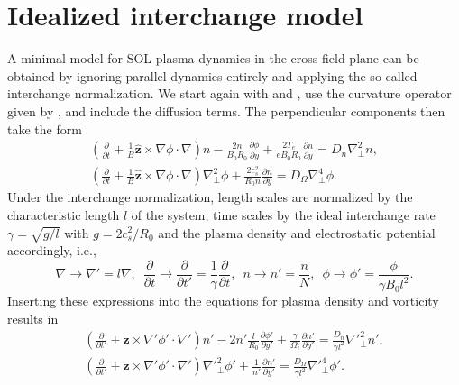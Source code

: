 \section{Idealized interchange model}
A minimal model for SOL plasma dynamics in the cross-field plane can be obtained by ignoring parallel dynamics entirely and applying the so called interchange normalization. We start again with  and , use the curvature operator given by , and include the diffusion terms. The perpendicular components then take the form
\begin{subequations}
	\begin{gather}
		\left(\frac{\partial}{\partial t} + \frac{1}{B}\widehat{\textbf{z}}\times \nabla\phi\cdot\nabla\right) n - \frac{2n}{B_0 R_0}\frac{\partial \phi}{\partial y} + \frac{2T_e}{eB_0R_0}\frac{\partial n}{\partial y} = D_n\nabla_\perp^2 n,
		\\
		 \left(\frac{\partial}{\partial t} + \frac{1}{B}\widehat{\textbf{z}}\times \nabla\phi\cdot\nabla\right)\nabla_\perp^2\phi + \frac{2c_s^2}{R_0n}\frac{\partial n}{\partial y} = D_\Omega\nabla_\perp^4 \phi.
	\end{gather}
\end{subequations}
Under the interchange normalization, length scales are normalized by the characteristic length $l$ of the system, time scales by the ideal interchange rate $\gamma = \sqrt{g/l}$ with $g=2c_s^2/R_0$ and the plasma density and electrostatic potential accordingly, i.e.,
\begin{equation}
	\nabla \rightarrow \nabla' = l\nabla, \,\,\, \frac{\partial}{\partial t} \rightarrow \frac{\partial}{\partial t'} = \frac{1}{\gamma}\frac{\partial}{\partial t}, \,\,\,n \rightarrow n' = \frac{n}{N},\,\,\,\phi \rightarrow \phi' = \frac{\phi}{\gamma B_0l^2}.
\end{equation}
Inserting these expressions into the equations for plasma density and vorticity results in 
\begin{subequations}
	\begin{gather}
		\left(\frac{\partial}{\partial t'} + \widehat{\textbf{z}}\times \nabla'\phi'\cdot\nabla'\right) n' - 2n'\frac{l}{R_0}\frac{\partial \phi'}{\partial y'} + \frac{\gamma}{\Omega_i}\frac{\partial n'}{\partial y'} = \frac{D_n}{\gamma l^2}{\nabla'}_\perp^2 n',
		\\
		\left(\frac{\partial}{\partial t'} + \widehat{\textbf{z}}\times \nabla'\phi'\cdot\nabla'\right){\nabla'}_\perp^2\phi' + \frac{1}{n'}\frac{\partial n'}{\partial y'} = \frac{D_\Omega}{\gamma l^2}{\nabla'}_\perp^4 \phi'.
	\end{gather}
\end{subequations}
